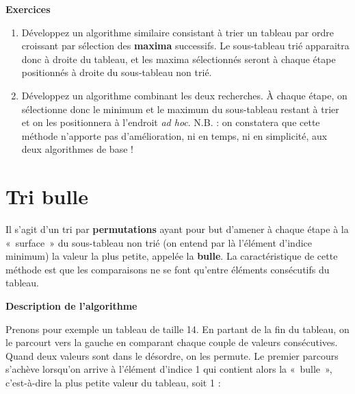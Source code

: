 \bigskip

{\sffamily\bfseries\upshape
Exercices}

\liststyleExercice
\begin{enumerate}
\item {
Développez un algorithme similaire consistant à trier un tableau par
ordre croissant par sélection des \textbf{maxima} successifs. Le
sous-tableau trié apparaitra donc à droite du tableau, et les maxima
sélectionnés seront à chaque étape positionnés à droite du sous-tableau
non trié. }
\item {
Développez un algorithme combinant les deux recherches. À chaque étape,
on sélectionne donc le minimum et le maximum du sous-tableau restant à
trier et on les positionnera à l’endroit \textit{ad hoc}. N.B. : on
constatera que cette méthode n’apporte pas d’amélioration, ni en temps,
ni en simplicité, aux deux algorithmes de base !}
\end{enumerate}
\section{Tri bulle}
{
Il s’agit d’un tri par \textbf{permutations} ayant pour but d’amener à
chaque étape à la «~surface~» du sous-tableau non trié (on entend par
là l’élément d’indice minimum) la valeur la plus petite, appelée la
\textbf{bulle}. La caractéristique de cette méthode est que les
comparaisons ne se font qu’entre éléments consécutifs du tableau.}

{\sffamily\bfseries\upshape
Description de l’algorithme}

{
Prenons pour exemple un tableau de taille 14. En partant de la fin du
tableau, on le parcourt vers la gauche en comparant chaque couple de
valeurs consécutives. Quand deux valeurs sont dans le désordre, on les
permute. Le premier parcours s’achève lorsqu’on arrive à l’élément
d’indice 1 qui contient alors la «~bulle~»,
c'est-à-dire la plus petite valeur du tableau, soit 1
:}


\bigskip

